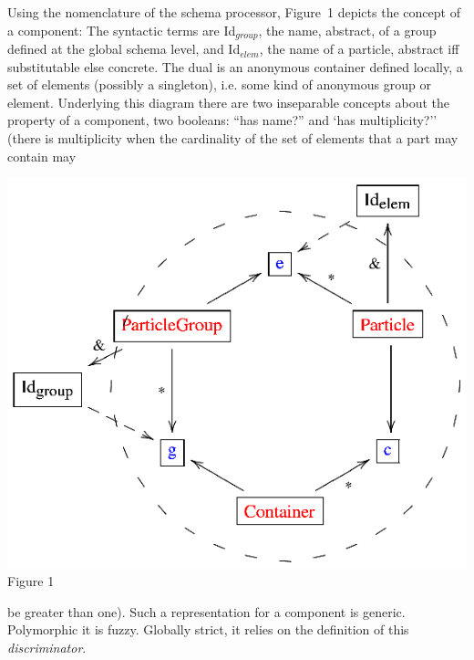 \noindent
\begin{minipage}[h]{5.2cm}
Using the nomenclature of the schema processor, Figure~1 depicts the concept of a component: The syntactic terms are Id$_{group}$, the name, abstract, of a group defined at the global schema level, and Id$_{elem}$, the name of a particle, abstract iff substitutable else concrete. The dual is an anonymous container defined locally, a set of  elements (possibly a singleton), i.e. some kind of anonymous group or element. Underlying this diagram there are two inseparable concepts about the property of a component, two booleans: ``has name?'' and `has multiplicity?'' (there is multiplicity when the cardinality of the set of elements that a part may contain may
\end{minipage}
\begin{minipage}[h]{8.8cm}
 \begin{center}
 \includegraphics[]{part8/Viallefond_P52/P52_1.eps}
 \\Figure 1
 \end{center}

\end{minipage}
\hfill
be greater than one). Such a representation for a component is generic. Polymorphic it is fuzzy. Globally strict, it relies on the definition of this 
{\it discriminator}.


